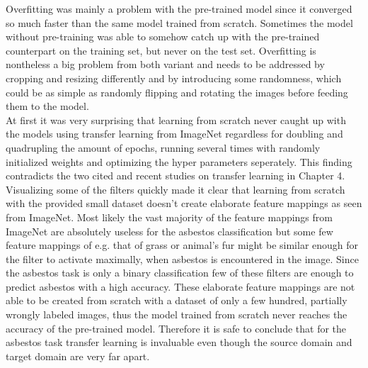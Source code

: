 Overfitting was mainly a problem with the pre-trained model since it converged so much faster than the same model trained from scratch. Sometimes the model without pre-training was able to somehow catch up with the pre-trained counterpart on the training set, but never on the test set. Overfitting is nontheless a big problem from both variant and needs to be addressed by cropping and resizing differently and by introducing some randomness, which could be as simple as randomly flipping and rotating the images before feeding them to the model.\\

At first it was very surprising that learning from scratch never caught up with the models using transfer learning from ImageNet regardless for doubling and quadrupling the amount of epochs, running several times with randomly initialized  weights and optimizing the hyper parameters seperately. This finding contradicts the two cited and recent studies \cite{he2018rethinking, kornblith2018better} on transfer learning in Chapter 4. Visualizing some of the filters quickly made it clear that learning from scratch with the provided small dataset doesn't create elaborate feature mappings as seen from ImageNet. Most likely the vast majority of the feature mappings from ImageNet  are absolutely useless for the asbestos classification but some few feature mappings of e.g. that of grass or animal's fur might be similar enough for the filter to activate maximally, when asbestos is encountered in the image. Since the asbestos task is only a binary classification few of these filters are enough to predict asbestos with a high accuracy. These elaborate feature mappings are not able to be created from scratch with a dataset of only a few hundred, partially wrongly labeled images, thus the model trained from scratch never reaches the accuracy of the pre-trained model. Therefore it is safe to conclude that for the asbestos task transfer learning is invaluable even though the source domain and target domain are very far apart.
